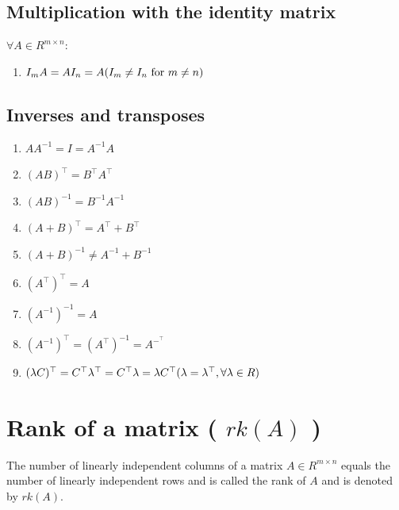 \subsection{Multiplication with the identity matrix}
$\forall A \in  R^{m\times n}$:

\begin{enumerate}
    \item $I_mA = AI_n = A \hfill (I_m \neq I_n \text{ for } m \neq n)$
\end{enumerate}


\subsection{Inverses and transposes}
\begin{enumerate}
    \item $AA^{-1} = I = A^{-1}A$

    \item $(AB)^\top  = B^\top A^\top $

    \item $(AB)^{-1} = B^{-1}A^{-1}$

    \item $(A + B)^\top  = A^\top  + B^\top $

    \item $(A + B)^{-1} \neq A^{-1} + B^{-1}$

    \item $(A^\top )^\top  = A$

    \item $(A^{-1})^{-1} = A$

    \item $(A^{-1})^\top  = (A^\top )^{-1} = A^{-^\top} $

    \item $(\lambda C)^\top  = C^\top \lambda ^\top  = C^\top \lambda  = \lambda C^\top  \hfill (\lambda  = \lambda ^\top , \forall\lambda  \in R)$
\end{enumerate}


\section{Rank of a matrix ( $rk(A)$ )}\label{Rank of a matrix}
The number of linearly independent columns of a matrix $A \in  R^{m\times n}$ equals the number of linearly independent rows and is called the rank of $A$ and is denoted by $rk(A)$.

